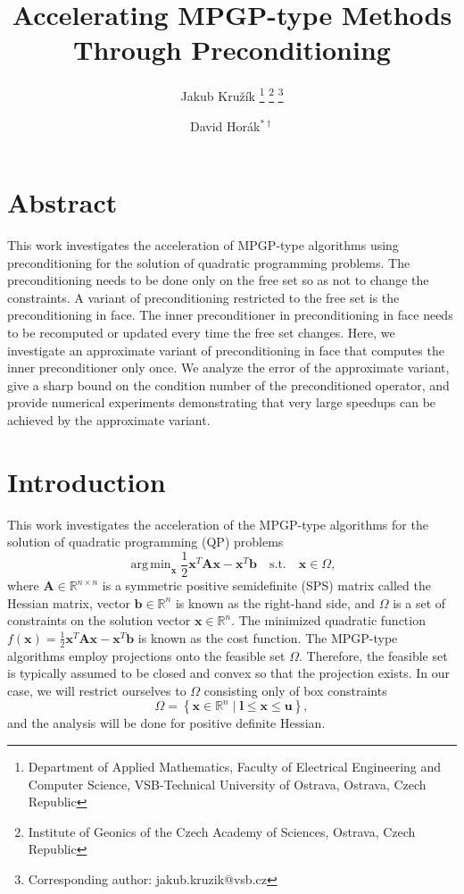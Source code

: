 \documentclass[11pt]{article}
\title{Accelerating MPGP-type Methods Through Preconditioning}
\author{Jakub Kružík \thanks{Department of Applied Mathematics, Faculty of Electrical Engineering and Computer Science, VSB-Technical University of Ostrava, Ostrava, Czech Republic}
\thanks{Institute of Geonics of the Czech Academy of Sciences, Ostrava, Czech Republic}
\thanks{Corresponding author: jakub.kruzik@vsb.cz}
\and David Horák$^{* \dag}$}
\theoremstyle{plain}
\theoremstyle{definition}
\DeclareMathOperator*{\argmin}{arg\,min}
\newcommand{\Vl}{\bm{l}}
\newcommand{\Vb}{\bm{b}}
\newcommand{\Vu}{\bm{u}}
\newcommand{\Vx}{\bm{x}}
\newcommand{\MA}{\bm{A}}
\begin{document}
\maketitle
\section*{Abstract}
This work investigates the acceleration of MPGP-type algorithms using preconditioning for the solution of quadratic programming problems.
The preconditioning needs to be done only on the free set so as not to change the constraints.
A variant of preconditioning restricted to the free set is the preconditioning in face.
The inner preconditioner in preconditioning in face needs to be recomputed or updated every time the free set changes.
Here, we investigate an approximate variant of preconditioning in face that computes the inner preconditioner only once.
We analyze the error of the approximate variant, give a sharp bound on the condition number of the preconditioned operator, and provide numerical experiments demonstrating that very large speedups can be achieved by the approximate variant.

\section{Introduction}
This work investigates the acceleration of the MPGP-type \cite{Dos-book-09} algorithms for the solution of quadratic programming (QP) problems
\begin{equation}
  \label{eq:qp}
  \argmin_{\Vx} \frac{1}{2}\Vx^{T}\MA\bm{x}-\Vx^{T}\Vb\quad\text{s.t.}\quad \Vx \in \Omega,
\end{equation}
where $\MA \in \mathbb{R}^{n\times n}$ is a symmetric positive semidefinite (SPS) matrix called the Hessian matrix, vector $\Vb \in \mathbb{R}^{n}$ is known as the right-hand side, and $\Omega$ is a set of constraints on the solution vector $\Vx \in \mathbb{R}^{n}$.
The minimized quadratic function $f(\Vx) = \frac{1}{2}\Vx^{T}\MA\bm{x}-\Vx^{T}\Vb$ is known as the cost function.
The MPGP-type algorithms employ projections onto the feasible set $\Omega$.
Therefore, the feasible set is typically assumed to be closed and convex so that the projection exists.
In our case, we will restrict ourselves to $\Omega$ consisting only of box constraints
\begin{equation*}
  \Omega = \left\{\Vx \in \mathbb{R}^n \mid \Vl \leq \Vx \leq \Vu \right\},
\end{equation*}
and the analysis will be done for positive definite Hessian.
\end{document}
